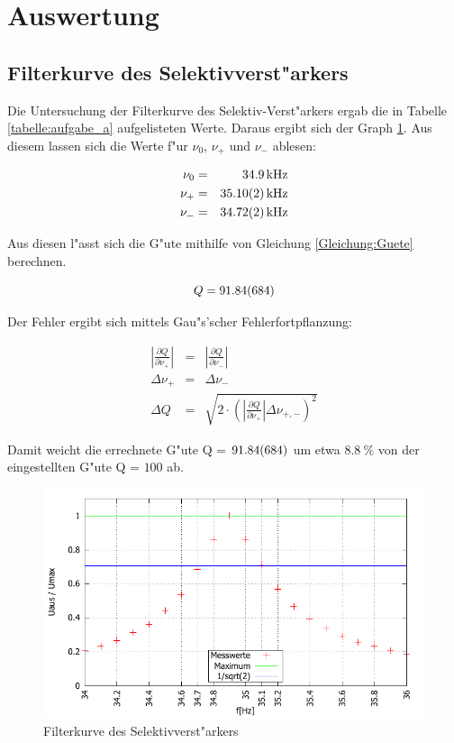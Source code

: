 \section{Auswertung}
	\label{sec:auswertung}

	\subsection{Filterkurve des Selektivverst"arkers} %
	\label{sub:subsection_name}
	
	Die Untersuchung der Filterkurve des Selektiv-Verst"arkers ergab die in Tabelle \ref{tabelle:aufgabe_a} aufgelisteten Werte.
	Daraus ergibt sich der Graph \ref{graph:aufgabe_a}.
	Aus diesem lassen sich die Werte f"ur $\nu_\mathrm{0}$, $\nu_\mathrm{+}$ und $\nu_\mathrm{-}$ ablesen:

	\begin{eqnarray*}
		\nu_\mathrm{0} &=& \SI{34.9}{\kilo\hertz} \\
		\nu_\mathrm{+} &=& \SI{35.10 (2)}{\kilo\hertz}\\
		\nu_\mathrm{-} &=& \SI{34.72 (2)}{\kilo\hertz}
	\end{eqnarray*}

	Aus diesen l"asst sich die G"ute mithilfe von Gleichung \eqref{Gleichung:Guete} berechnen.

	\begin{equation*}
		Q = \SI{91.84 (684)}{}
	\end{equation*}

	Der Fehler ergibt sich mittels Gau"s'scher Fehlerfortpflanzung:

	\begin{eqnarray*}
		|\frac{\partial Q}{\partial\nu_\mathrm{+}}| &=& |\frac{\partial Q}{\partial\nu_\mathrm{-}}| \\
		\Delta \nu_\mathrm{+} &=& \Delta \nu_\mathrm{-} \\
		\Delta Q &=& \sqrt{ 2 \cdot \left( |\frac{\partial Q}{\partial\nu_\mathrm{+}}| \Delta \nu_\mathrm{+,-} \right)^2}
	\end{eqnarray*}

	Damit weicht die errechnete G"ute Q = $\SI{91.84 (684)}{}$ um etwa $\SI{8.8}{\%}$ von der eingestellten G"ute Q = $100$ ab.

	

	\begin{figure}[!h]
		\centering
		\includegraphics[width = 14cm]{img/arschlecken.pdf}
		\caption{Filterkurve des Selektivverst"arkers}
		\label{graph:aufgabe_a}
	\end{figure}